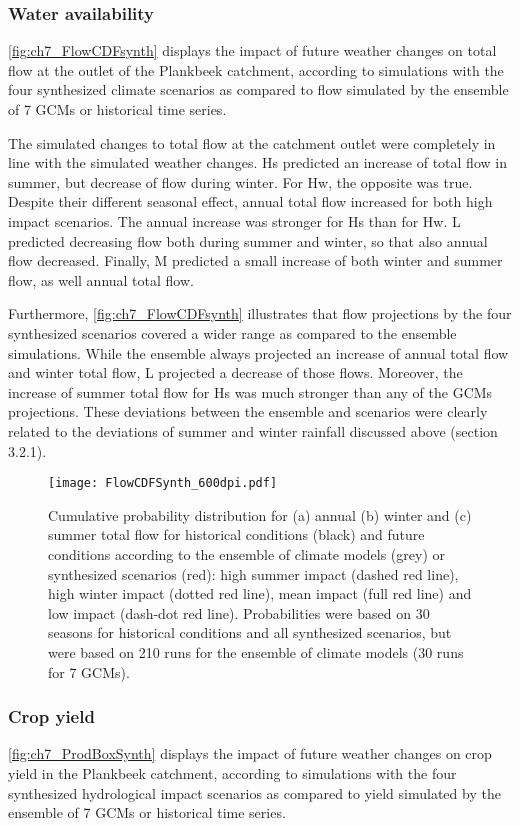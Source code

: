 \subsubsection{Water availability}
\autoref{fig:ch7_FlowCDFsynth} displays the impact of future weather changes on total flow at the outlet of the Plankbeek catchment, according to simulations with the four synthesized climate scenarios as compared to flow simulated by the ensemble of 7 GCMs or historical time series. 

The simulated changes to total flow at the catchment outlet were completely in line with the simulated weather changes. Hs predicted an increase of total flow in summer, but decrease of flow during winter. For Hw, the opposite was true. Despite their different seasonal effect, annual total flow increased for both high impact scenarios. The annual increase was stronger for Hs than for Hw. L predicted decreasing flow both during summer and winter, so that also annual flow decreased. Finally, M predicted a small increase of both winter and summer flow, as well annual total flow. 

Furthermore, \autoref{fig:ch7_FlowCDFsynth} illustrates that flow projections by the four synthesized scenarios covered a wider range as compared to the ensemble simulations. While the ensemble always projected an increase of annual total flow and winter total flow, L projected a decrease of those flows. Moreover, the increase of summer total flow for Hs was much stronger than any of  the GCMs projections. These deviations between the ensemble and scenarios were clearly related to the deviations of summer and winter rainfall discussed above (section 3.2.1).

\begin{figure}[tbhp]
	\centering
		\texttt{[image: FlowCDFSynth\_600dpi.pdf]}
	\caption{Cumulative probability distribution for (a) annual (b) winter and (c) summer total flow for historical conditions (black) and future conditions according to the ensemble of climate models (grey) or synthesized scenarios (red): high summer impact (dashed red line), high winter impact (dotted red line), mean impact (full red line) and low impact (dash-dot red line). Probabilities were based on 30 seasons for historical conditions and all  synthesized scenarios, but were based on 210 runs for the ensemble of climate models (30 runs for 7 GCMs). }
	\label{fig:ch7_FlowCDFsynth}
\end{figure}   
 
\subsubsection{Crop yield}
\autoref{fig:ch7_ProdBoxSynth} displays the impact of future weather changes on crop yield in the Plankbeek catchment, according to simulations with the four synthesized hydrological impact scenarios as compared to yield simulated by the ensemble of 7 GCMs or historical time series. 

